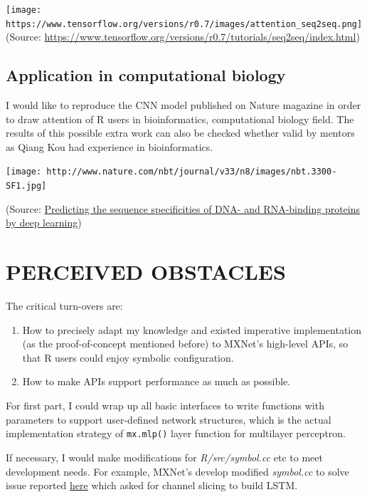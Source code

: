 \documentclass[]{article}
\providecommand{\tightlist}{%
  \setlength{\itemsep}{0pt}\setlength{\parskip}{0pt}}
\begin{document}
\texttt{[image: https://www.tensorflow.org/versions/r0.7/images/attention\_seq2seq.png]}
(Source:
\url{https://www.tensorflow.org/versions/r0.7/tutorials/seq2seq/index.html})

\subsection{Application in computational
biology}\label{application-in-computational-biology}

I would like to reproduce the CNN model published on Nature magazine in
order to draw attention of R users in bioinformatics, computational
biology field. The results of this possible extra work can also be
checked whether valid by mentors as Qiang Kou had experience in
bioinformatics.

\texttt{[image: http://www.nature.com/nbt/journal/v33/n8/images/nbt.3300-SF1.jpg]}

(Source:
\href{http://www.nature.com/nbt/journal/v33/n8/full/nbt.3300.html}{Predicting
the sequence specificities of DNA- and RNA-binding proteins by deep
learning})

\section{PERCEIVED OBSTACLES}\label{perceived-obstacles}

The critical turn-overs are:

\begin{enumerate}
\def\labelenumi{\arabic{enumi}.}
\tightlist
\item
  How to precisely adapt my knowledge and existed imperative
  implementation (as the proof-of-concept mentioned before) to MXNet's
  high-level APIs, so that R users could enjoy symbolic configuration.
\item
  How to make APIs support performance as much as possible.
\end{enumerate}

For first part, I could wrap up all basic interfaces to write functions
with parameters to support user-defined network structures, which is the
actual implementation strategy of \texttt{mx.mlp()} layer function for
multilayer perceptron.

If necessary, I would make modifications for \emph{R/src/symbol.cc} etc
to meet development needs. For example, MXNet's develop modified
\emph{symbol.cc} to solve issue reported
\href{https://github.com/dmlc/mxnet/issues/837\#issuecomment-166937031}{here}
which asked for channel slicing to build LSTM.
\end{document}
